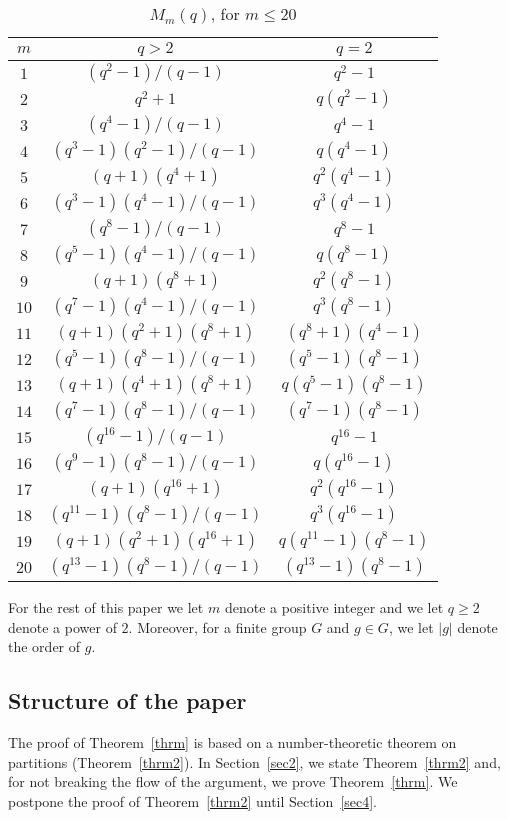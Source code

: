 \documentclass{amsart}
\begin{document}
\begin{table}[!!h]
\begin{tabular}{|c|cc|}\hline
   $m$     &$q>2$&$q=2$\\\hline
$1$&$(q^2-1)/(q-1)$&$q^2-1$\\
$2$&$q^2+1$&$q(q^2-1)$\\
$3$&$(q^4-1)/(q-1)$&$q^4-1$\\
$4$&$(q^3-1)(q^2-1)/(q-1)$&$q(q^4-1)$\\
$5$&$(q+1)(q^4+1)$&$q^2(q^4-1)$\\
$6$&$(q^3-1)(q^4-1)/(q-1)$&$q^3(q^4-1)$\\
$7$&$(q^8-1)/(q-1)$&$q^8-1$\\
$8$&$(q^5-1)(q^4-1)/(q-1)$&$q(q^8-1)$\\
$9$&$(q+1)(q^8+1)$&$q^2(q^8-1)$\\
$10$&$(q^7-1)(q^4-1)/(q-1)$&$q^3(q^8-1)$\\
$11$&$(q+1)(q^2+1)(q^8+1)$&$(q^8+1)(q^4-1)$\\
$12$&$(q^5-1)(q^8-1)/(q-1)$&$(q^5-1)(q^8-1)$\\
$13$&$(q+1)(q^4+1)(q^8+1)$&$q(q^5-1)(q^8-1)$\\
$14$&$(q^7-1)(q^8-1)/(q-1)$&$(q^7-1)(q^8-1)$\\
$15$&$(q^{16}-1)/(q-1)$&$q^{16}-1$\\
$16$&$(q^9-1)(q^8-1)/(q-1)$&$q(q^{16}-1)$\\
$17$&$(q+1)(q^{16}+1)$&$q^2(q^{16}-1)$\\
$18$&$(q^{11}-1)(q^8-1)/(q-1)$&$q^3(q^{16}-1)$\\
$19$&$(q+1)(q^2+1)(q^{16}+1)$&$q(q^{11}-1)(q^{8}-1)$\\
$20$&$(q^{13}-1)(q^8-1)/(q-1)$&$(q^{13}-1)(q^8-1)$\\\hline
\end{tabular}
\caption{$M_{m}(q)$, for $m\leq 20$}\label{table}
\end{table}
For the rest of this paper we let $m$ denote a positive integer and we let $q\geq 2$ denote a power of $2$. Moreover, for a finite group $G$ and $g\in G$, we let $|g|$ denote the order of $g$.

\subsection{Structure of the paper}\label{structure} The proof of Theorem~\ref{thrm} is based on a number-theoretic theorem on partitions (Theorem~\ref{thrm2}). In Section~\ref{sec2}, we state Theorem~\ref{thrm2} and, for not breaking the flow of the argument, we prove 
Theorem~\ref{thrm}.  We postpone the proof of Theorem~\ref{thrm2} until Section~\ref{sec4}.
\end{document}
